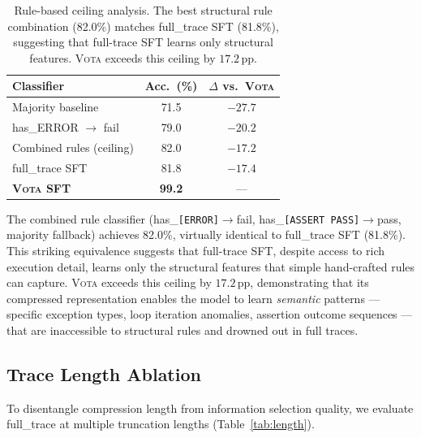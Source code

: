 \documentclass[11pt,a4paper]{article}
\newcommand{\vota}{\textsc{Vota}}
\newcommand{\pp}{\,\text{pp}}
\begin{document}
\begin{table}[t]
\centering
\small
\begin{tabular}{lcc}
\toprule
\textbf{Classifier} & \textbf{Acc.\ (\%)} & \textbf{$\Delta$ vs.\ \vota{}} \\
\midrule
Majority baseline & 71.5 & $-27.7$ \\
has\_ERROR $\to$ fail & 79.0 & $-20.2$ \\
Combined rules (ceiling) & 82.0 & $-17.2$ \\
\midrule
full\_trace SFT & 81.8 & $-17.4$ \\
\textbf{\vota{} SFT} & \textbf{99.2} & --- \\
\bottomrule
\end{tabular}
\caption{Rule-based ceiling analysis. The best structural rule combination (82.0\%) matches full\_trace SFT (81.8\%), suggesting that full-trace SFT learns only structural features. \vota{} exceeds this ceiling by $17.2\pp$.}
\label{tab:rules}
\end{table}

The combined rule classifier (has\_\texttt{[ERROR]}$\to$fail, has\_\texttt{[ASSERT PASS]}$\to$pass, majority fallback) achieves 82.0\%, virtually identical to full\_trace SFT (81.8\%).
This striking equivalence suggests that full-trace SFT, despite access to rich execution detail, learns only the structural features that simple hand-crafted rules can capture.
\vota{} exceeds this ceiling by $17.2\pp$, demonstrating that its compressed representation enables the model to learn \emph{semantic} patterns --- specific exception types, loop iteration anomalies, assertion outcome sequences --- that are inaccessible to structural rules and drowned out in full traces.

\subsection{Trace Length Ablation}
\label{sec:length}

To disentangle compression length from information selection quality, we evaluate full\_trace at multiple truncation lengths (Table~\ref{tab:length}).
\end{document}
